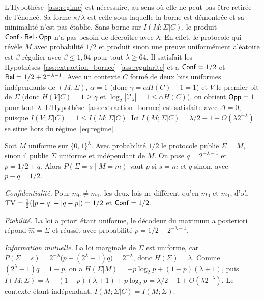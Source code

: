\begin{sloppypar}
\begin{remark}
\label{rem:scope_trilemme_classique}
L'Hypoth\`ese~\ref{ass:regime} est n\'ecessaire, au sens o\`u elle ne peut pas \^etre retir\'ee de l'\'enonc\'e. Sa forme $\kappa/\lambda$ est celle sous laquelle la borne est d\'emontr\'ee et sa minimalit\'e n'est pas \'etablie. Sans borne sur
$I(M;\Sigma|C)$, le produit $\mathsf{Conf} \cdot \mathsf{Rel} \cdot \mathsf{Opp}$ n'a pas besoin
de d\'ecro\^itre avec $\lambda$. En effet, le protocole qui r\'ev\`ele $M$ avec
probabilit\'e $1/2$ et produit sinon une preuve uniform\'ement
al\'eatoire est $\beta$-r\'egulier avec $\beta \leq 1{,}04$ pour tout
$\lambda \geq 64$. Il satisfait les
Hypoth\`eses~\ref{ass:extraction_bornee}--\ref{ass:regularite} et a
$\mathsf{Conf} = 1/2$ et $\mathsf{Rel} = 1/2 + 2^{-\lambda-1}$. Avec un contexte $C$
form\'e de deux bits uniformes ind\'ependants de $(M,\Sigma)$, $\alpha = 1$
(donc $\gamma = \alpha H(C) - 1 = 1$) et $V$ le premier bit de $\Sigma$
(donc $H(V|C) = 1 \geq \gamma$ et $\log_2|\mathcal{V}_\lambda| = 1 \leq \alpha H(C)$),
on obtient $\mathsf{Opp} = 1$ pour tout $\lambda$. L'Hypoth\`ese~\ref{ass:extraction_bornee} est
satisfaite avec $\Delta = 0$, puisque $I(V;\Sigma|C) = 1 \leq I(M;\Sigma|C)$. Ici
$I(M;\Sigma|C) = \lambda/2 - 1 + O(\lambda 2^{-\lambda})$ se situe hors
du r\'egime~\eqref{eq:regime}.
\end{remark}

\begin{Preuve}
Soit $M$ uniforme sur $\{0,1\}^\lambda$. Avec probabilit\'e $1/2$ le protocole
publie $\Sigma = M$, sinon il publie $\Sigma$ uniforme et ind\'ependant de $M$. On
pose $q = 2^{-\lambda-1}$ et $p = 1/2 + q$. Alors $P(\Sigma = s \mid M = m)$ vaut
$p$ si $s = m$ et $q$ sinon, avec $p - q = 1/2$.

\emph{Confidentialit\'e.} Pour $m_0 \neq m_1$, les deux lois ne diff\`erent qu'en
$m_0$ et $m_1$, d'o\`u $\operatorname{TV} = \tfrac12(|p-q|+|q-p|) = 1/2$ et $\mathsf{Conf} = 1/2$.

\emph{Fiabilit\'e.} La loi a priori \'etant uniforme, le d\'ecodeur du maximum a
posteriori r\'epond $\hat m = \Sigma$ et r\'eussit avec probabilit\'e
$p = 1/2 + 2^{-\lambda-1}$.

\emph{Information mutuelle.} La loi marginale de $\Sigma$ est uniforme, car
$P(\Sigma=s) = 2^{-\lambda}\bigl(p + (2^\lambda-1)q\bigr) = 2^{-\lambda}$, donc
$H(\Sigma) = \lambda$. Comme $(2^\lambda-1)q = 1-p$, on a
$H(\Sigma|M) = -p\log_2 p + (1-p)(\lambda+1)$, puis
$I(M;\Sigma) = \lambda - (1-p)(\lambda+1) + p\log_2 p = \lambda/2 - 1 + O(\lambda 2^{-\lambda})$.
Le contexte \'etant ind\'ependant, $I(M;\Sigma|C) = I(M;\Sigma)$.


\end{Preuve}
\end{sloppypar}
